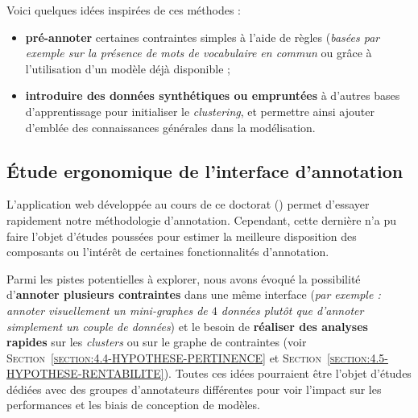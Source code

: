 		Voici quelques idées inspirées de ces méthodes :
		\begin{itemize}
			\item \textbf{pré-annoter} certaines contraintes simples à l'aide de règles (\textit{basées par exemple sur la présence de mots de vocabulaire en commun} ou grâce à l'utilisation d'un modèle déjà disponible ; 
			\item \textbf{introduire des données synthétiques ou empruntées} à d'autres bases d'apprentissage pour initialiser le \textit{clustering}, et permettre ainsi ajouter d'emblée des connaissances générales dans la modélisation.
		\end{itemize}
	
	\subsection{Étude ergonomique de l'interface d'annotation}
	\label{section:4.7.5-HYPOTHESES-NON-VERIFIEES-ERGONOMIQUE}
	
		L'application web développée au cours de ce doctorat (\cite{schild-etal:2022:cognitivefactory-interactiveclusteringgui}) permet d'essayer rapidement notre méthodologie d'annotation.
		Cependant, cette dernière n'a pu faire l'objet d'études poussées pour estimer la meilleure disposition des composants ou l'intérêt de certaines fonctionnalités d'annotation.
		
		Parmi les pistes potentielles à explorer, nous avons évoqué la possibilité d'\textbf{annoter plusieurs contraintes} dans une même interface (\textit{par exemple : annoter visuellement un mini-graphes de $4$ données plutôt que d'annoter simplement un couple de données}) et le besoin de \textbf{réaliser des analyses rapides} sur les \textit{clusters} ou sur le graphe de contraintes (voir \textsc{Section~\ref{section:4.4-HYPOTHESE-PERTINENCE}} et \textsc{Section~\ref{section:4.5-HYPOTHESE-RENTABILITE}}).
		Toutes ces idées pourraient être l'objet d'études dédiées avec des groupes d'annotateurs différentes pour voir l'impact sur les performances et les biais de conception de modèles.